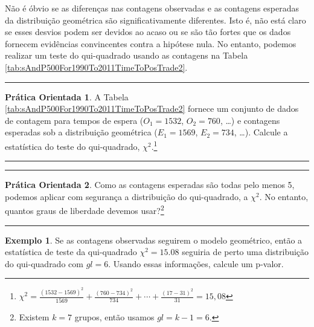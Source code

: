 \documentclass[
]{book}
\theoremstyle{definition}
\theoremstyle{definition}
\newtheorem{example}{Exemplo}[chapter]
\theoremstyle{definition}
\newtheorem{exercise}{Prática Orientada}[chapter]
\theoremstyle{definition}
\theoremstyle{remark}
\begin{document}
Não é óbvio se as diferenças nas contagens observadas e as contagens esperadas da distribuição geométrica são significativamente diferentes. Isto é, não está claro se esses desvios podem ser devidos ao acaso ou se são tão fortes que os dados fornecem evidências convincentes contra a hipótese nula. No entanto, podemos realizar um teste do qui-quadrado usando as contagens na Tabela \ref{tab:sAndP500For1990To2011TimeToPosTrade2}.

\begin{center}\rule{0.5\linewidth}{0.5pt}\end{center}

\begin{exercise}
\protect\hypertarget{exr:unnamed-chunk-248}{}{\label{exr:unnamed-chunk-248} }A Tabela \ref{tab:sAndP500For1990To2011TimeToPosTrade2} fornece um conjunto de dados de contagem para tempos de espera (\(O_1=1532\), \(O_2=760\), \ldots) e contagens esperadas sob a distribuição geométrica (\(E_1=1569\), \(E_2=734\), \ldots). Calcule a estatística do teste do qui-quadrado, \(\chi^2\).\footnote{\(\chi^2=\frac{(1532-1569)^2}{1569} + \frac{(760-734)^2}{734} + \cdots + \frac{(17-31)^2}{31} = 15,08\)}
\end{exercise}

\begin{center}\rule{0.5\linewidth}{0.5pt}\end{center}

\begin{center}\rule{0.5\linewidth}{0.5pt}\end{center}

\begin{exercise}
\protect\hypertarget{exr:unnamed-chunk-249}{}{\label{exr:unnamed-chunk-249} }Como as contagens esperadas são todas pelo menos 5, podemos aplicar com segurança a distribuição do qui-quadrado, a \(\chi^2\). No entanto, quantos graus de liberdade devemos usar?\footnote{Existem \(k = 7\) grupos, então usamos \(gl = k-1 = 6\).}
\end{exercise}

\begin{center}\rule{0.5\linewidth}{0.5pt}\end{center}

\begin{example}
\protect\hypertarget{exm:RejectGeomModelForSP500StockDataFor1990To2011}{}{\label{exm:RejectGeomModelForSP500StockDataFor1990To2011} }Se as contagens observadas seguirem o modelo geométrico, então a estatística de teste da qui-quadrado \(\chi^2 = 15.08\) seguiria de perto uma distribuição do qui-quadrado com \(gl = 6\). Usando essas informações, calcule um p-valor.
\end{example}
\end{document}
